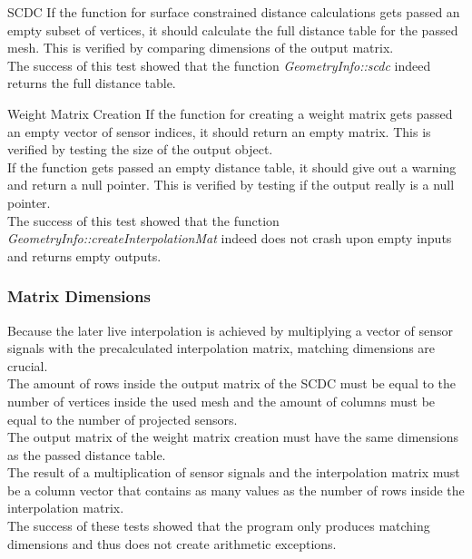 \begin{aims}
	\item[\hspace*{11mm} SCDC] If the function for surface constrained distance calculations gets passed an empty subset of vertices, it should calculate the full distance table for the passed mesh. This is verified by comparing dimensions of the output matrix. \\
	The success of this test showed that the function \textit{GeometryInfo::scdc} indeed returns the full distance table.
\end{aims}

\begin{aims}
	\item[\hspace*{11mm} Weight Matrix Creation] If the function for creating a weight matrix gets passed an empty vector of sensor indices, it should return an empty matrix. This is verified by testing the size of the output object.\\
	If the function gets passed an empty distance table, it should give out a warning and return a null pointer.
	This is verified by testing if the output really is a null pointer.\\
	The success of this test showed that the function \textit{GeometryInfo::createInterpolationMat} indeed does not crash upon empty inputs and returns empty outputs.
\end{aims}


\subsubsection{Matrix Dimensions}

Because the later live interpolation is achieved by multiplying a vector of sensor signals with the precalculated interpolation matrix, matching dimensions are crucial.\\
The amount of rows inside the output matrix of the SCDC must be equal to the number of vertices inside the used mesh and the amount of columns must be equal to the number of projected sensors. \\
The output matrix of the weight matrix creation must have the same dimensions as the passed distance table.\\
The result of a multiplication of sensor signals and the interpolation matrix must be a column vector that contains as many values as the number of rows inside the interpolation matrix.\\
The success of these tests showed that the program only produces matching dimensions and thus does not create arithmetic exceptions.


